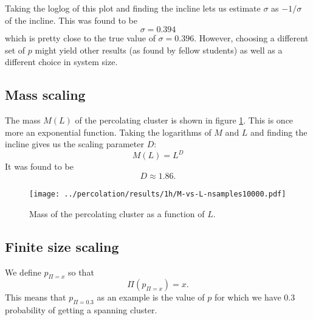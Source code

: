 \documentclass[a4paper,reprint,floatfix,amsmath,amssymb,aps,pra]{revtex4-1}
\begin{document}
Taking the loglog of this plot and finding the incline lets us estimate $\sigma$ as $-1/\sigma$ of the incline. This was found to be
\begin{equation}
  \sigma = 0.394
\end{equation} 
which is pretty close to the true value of $\sigma = 0.396$. However, choosing a different set of $p$ might yield other results (as found by fellow students) as well as a different choice in system size.

\subsection{Mass scaling}

The mass $M(L)$ of the percolating cluster is shown in figure \ref{fig:mass-scaling}. This is once more an exponential function. Taking the logarithms of $M$ and $L$ and finding the incline gives us the scaling parameter $D$:
\begin{equation}
  M(L) = L^{D}
\end{equation}
It was found to be
\begin{equation}
  D \approx 1.86.
\end{equation}
\begin{figure}
  \centering
  \texttt{[image: ../percolation/results/1h/M-vs-L-nsamples10000.pdf]}
  \caption{Mass of the percolating cluster as a function of $L$.}
  \label{fig:mass-scaling}
\end{figure}

\subsection{Finite size scaling}

We define $p_{\Pi=x}$ so that 
\begin{equation}
  \Pi(p_{\Pi=x}) = x.
\end{equation} 
This means that $p_{\Pi=0.3}$ as an example is the value of $p$ for which we have $0.3$ probability of getting a spanning cluster.
\end{document}
